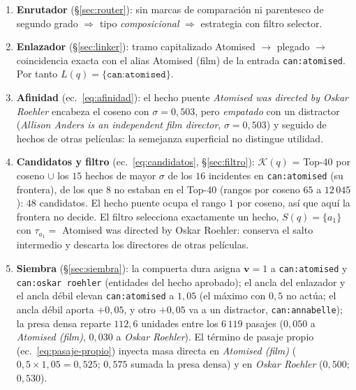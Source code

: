 \documentclass[11pt,a4paper]{article}
\begin{document}
\begin{enumerate}[leftmargin=1.6em, itemsep=2pt]
\item \textbf{Enrutador} (\S\ref{sec:router}): sin marcas de comparación ni
  parentesco de segundo grado $\Rightarrow$ tipo \emph{composicional}
  $\Rightarrow$ estrategia con filtro selector.
\item \textbf{Enlazador} (\S\ref{sec:linker}): tramo capitalizado
  \guillemotleft{}Atomised\guillemotright{} $\to$ plegado $\to$ coincidencia exacta con el alias
  \guillemotleft{}Atomised (film)\guillemotright{} de la entrada \texttt{can:atomised}. Por tanto
  $L(q) = \{\texttt{can:atomised}\}$.
\item \textbf{Afinidad} (ec.~\ref{eq:afinidad}): el hecho puente
  \emph{\guillemotleft{}Atomised was directed by Oskar Roehler\guillemotright{}} encabeza el coseno con
  $\sigma = 0{,}503$, pero \emph{empatado} con un distractor
  (\emph{\guillemotleft{}Allison Anders is an independent film director\guillemotright{}}, $\sigma=0{,}503$)
  y seguido de hechos de otras películas: la semejanza superficial no
  distingue utilidad.
\item \textbf{Candidatos y filtro} (ec.~\ref{eq:candidatos},
  \S\ref{sec:filtro}): $\mathcal{K}(q)$ = Top-40 por coseno $\cup$ los $15$ hechos de mayor
  $\sigma$ de los $16$ incidentes en \texttt{can:atomised} (su frontera),
  de los que $8$ no estaban en el Top-40 (rangos por coseno $65$ a
  $12\,045$): $48$ candidatos. El hecho puente ocupa el rango $1$ por
  coseno, así que aquí la frontera no decide. El filtro selecciona
  exactamente un hecho, $S(q) = \{a_1\}$ con
  $\tau_{a_1} = $ \guillemotleft{}Atomised was directed by Oskar Roehler\guillemotright{}:
  conserva el salto intermedio y descarta los directores de otras películas.
\item \textbf{Siembra} (\S\ref{sec:siembra}): la compuerta dura asigna
  $\mathbf{v}=1$ a \texttt{can:atomised} y \texttt{can:oskar roehler}
  (entidades del hecho aprobado); el ancla del enlazador y el ancla débil
  elevan \texttt{can:atomised} a $1{,}05$ (el máximo con $0{,}5$ no
  actúa; el ancla débil aporta $+0{,}05$, y otro $+0{,}05$ va a un
  distractor, \texttt{can:annabelle}); la presa densa reparte $112{,}6$
  unidades entre los $6\,119$ pasajes ($0{,}050$ a \emph{Atomised (film)},
  $0{,}030$ a \emph{Oskar Roehler}). El término de pasaje propio
  (ec.~\ref{eq:pasaje-propio}) inyecta masa directa en
  \emph{Atomised (film)} ($0{,}5\times1{,}05=0{,}525$; $0{,}575$ sumada
  la presa densa) y en \emph{Oskar Roehler} ($0{,}500$; $0{,}530$).

\end{enumerate}
\end{document}
